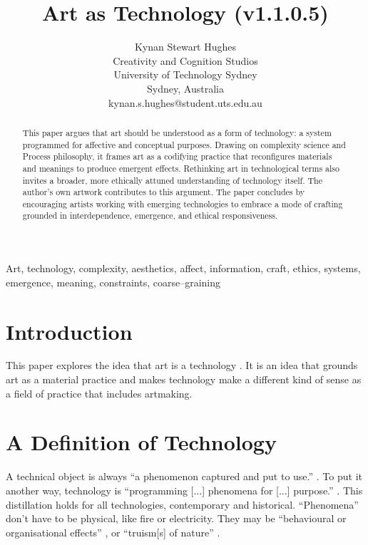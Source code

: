 \documentclass[letter:wpaper]{article}
\title{Art as Technology (v1.1.0.5)}
\author{Kynan Stewart Hughes\\
Creativity and Cognition Studios\\
University of Technology Sydney\\
Sydney, Australia\\
kynan.s.hughes@student.uts.edu.au\\
\newline
\newline
}
\begin{document}
 
\maketitle
\begin{abstract}
    This paper argues that art should be understood as a form of technology: a system programmed for affective and conceptual purposes. Drawing on complexity science and Process philosophy, it frames art as a codifying practice that reconfigures materials and meanings to produce emergent effects. Rethinking art in technological terms also invites a broader, more ethically attuned understanding of technology itself. The author’s own artwork contributes to this argument. The paper concludes by encouraging artists working with emerging technologies to embrace a mode of crafting grounded in interdependence, emergence, and ethical responsiveness.
\end{abstract}


Art, technology, complexity, aesthetics, affect, information, craft, ethics, systems, emergence, meaning, constraints, coarse–graining

\section{Introduction}

    This paper explores the idea that art is a technology \citep[pp.74–75]{SauvagnarguesArtmchns2016} \citep{GellThTchnlgyOfEnchntmnt1992} \citep[p.202]{OSullivanFrmAsthtcsToThAbstrctMchn2010}. It is an idea that grounds art as a material practice and makes technology make a different kind of sense as a field of practice that includes artmaking. 
    
\section{A Definition of Technology} 

    A technical object is always ``a phenomenon captured and put to use.'' \citep[p.53]{theNatureOfTechnology2009}. To put it another way, technology is ``programming [...] phenomena for [...] purpose.'' \citep[p.53]{theNatureOfTechnology2009}. This distillation holds for all technologies, contemporary and historical. ``Phenomena'' don't have to be physical, like fire or electricity. They may be ``behavioural or organisational  effects'' \citep[p.55]{theNatureOfTechnology2009}, or ``truism[s] of nature'' \citep[p.45]{theNatureOfTechnology2009}.
\end{document}
